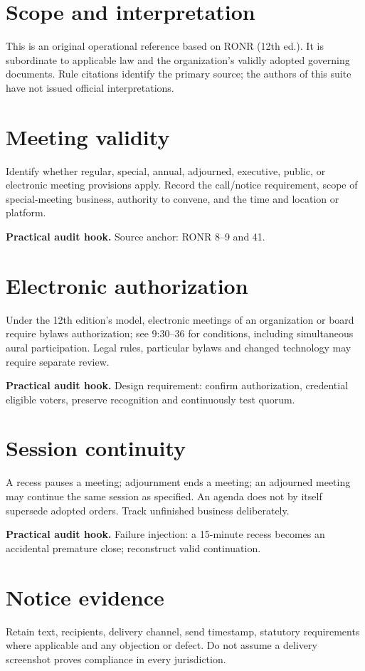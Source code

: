 \documentclass[11pt]{article}
\begin{document}
\SuiteOpen
\section{Scope and interpretation}
This is an original operational reference based on RONR (12th ed.). It is subordinate to applicable law and the organization’s validly adopted governing documents. Rule citations identify the primary source; the authors of this suite have not issued official interpretations.

\section{Meeting validity}
Identify whether regular, special, annual, adjourned, executive, public, or electronic meeting provisions apply. Record the call/notice requirement, scope of special-meeting business, authority to convene, and the time and location or platform.

\textbf{Practical audit hook.} Source anchor: RONR 8--9 and 41.

\section{Electronic authorization}
Under the 12th edition’s model, electronic meetings of an organization or board require bylaws authorization; see 9:30--36 for conditions, including simultaneous aural participation. Legal rules, particular bylaws and changed technology may require separate review.

\textbf{Practical audit hook.} Design requirement: confirm authorization, credential eligible voters, preserve recognition and continuously test quorum.

\section{Session continuity}
A recess pauses a meeting; adjournment ends a meeting; an adjourned meeting may continue the same session as specified. An agenda does not by itself supersede adopted orders. Track unfinished business deliberately.

\textbf{Practical audit hook.} Failure injection: a 15-minute recess becomes an accidental premature close; reconstruct valid continuation.

\section{Notice evidence}
Retain text, recipients, delivery channel, send timestamp, statutory requirements where applicable and any objection or defect. Do not assume a delivery screenshot proves compliance in every jurisdiction.
\end{document}
